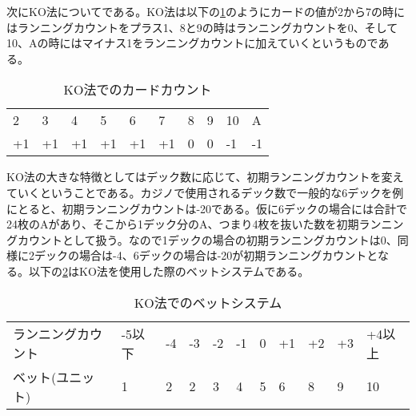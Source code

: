 次にKO法についてである。KO法は以下の\ref{koc}のようにカードの値が2から7の時にはランニングカウントをプラス1、8と9の時はランニングカウントを0、そして10、Aの時にはマイナス1をランニングカウントに加えていくというものである。
\begin{table}[H]
\begin{tabular}{llllllllll}
2&3&4&5&6&7&8&9&10&A \\
+1&+1&+1&+1&+1&+1&0&0&-1&-1 \\
\end{tabular}
\caption{KO法でのカードカウント}
\label{koc}
\end{table}
KO法の大きな特徴としてはデック数に応じて、初期ランニングカウントを変えていくということである。カジノで使用されるデック数で一般的な6デックを例にとると、初期ランニングカウントは-20である。仮に6デックの場合には合計で24枚のAがあり、そこから1デック分のA、つまり4枚を抜いた数を初期ランニングカウントとして扱う。なので1デックの場合の初期ランニングカウントは0、同様に2デックの場合は-4、6デックの場合は-20が初期ランニングカウントとなる。以下の\ref{kob}はKO法を使用した際のベットシステムである。
\begin{table}[H]
\begin{tabular}{lllllllllll}
ランニングカウント&-5以下&-4&-3&-2&-1&0&+1&+2&+3&+4以上 \\
ベット(ユニット)&1&2&2&3&4&5&6&8&9&10 \\
\end{tabular}
\caption{KO法でのベットシステム}
\label{kob}
\end{table}
